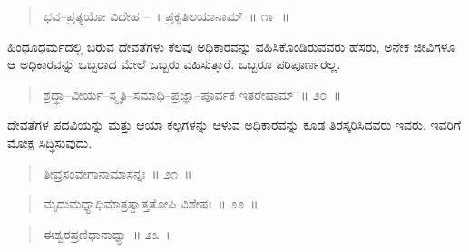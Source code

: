 \vspace{-0.3cm}

\begin{verse}
ಭವ–ಪ್ರತ್ಯಯೋ ವಿದೇಹ –~। ಪ್ರಕೃತಿಲಯಾನಾಮ್​~॥ ೧೯~॥
\end{verse}

\vspace{-0.3cm}


ಹಿಂಧೂಧರ್ಮದಲ್ಲಿ ಬರುವ ದೇವತೆಗಳು ಕೆಲವು ಅಧಿಕಾರವನ್ನು ವಹಿಸಿಕೊಂಡಿರುವ\break ವರು ಹೆಸರು, ಅನೇಕ ಜೀವಿಗಳೂ ಆ ಅಧಿಕಾರವನ್ನು ಒಬ್ಬರಾದ ಮೇಲೆ ಒಬ್ಬರು ವಹಿಸುತ್ತಾರೆ. ಒಬ್ಬರೂ ಪರಿಪೂರ್ಣರಲ್ಲ. 

\vspace{-0.3cm}

\begin{verse}
ಶ್ರದ್ಧಾ–ವೀರ್ಯ–ಸ್ಮೃತಿ–ಸಮಾಧಿ–ಪ್ರಜ್ಞಾ–ಪೂರ್ವಕ ಇತರೇಷಾಮ್​~॥ ೨೦~॥
\end{verse}

\vspace{-0.3cm}


ದೇವತೆಗಳ ಪದವಿಯನ್ನು ಮತ್ತು ಆಯಾ ಕಲ್ಪಗಳನ್ನು ಆಳುವ ಅಧಿಕಾರವನ್ನು ಕೂಡ ತಿರಸ್ಕರಿಸಿದವರು ಇವರು. ಇವರಿಗೆ ಮೋಕ್ಷ ಸಿದ್ಧಿಸುವುದು. 

\vspace{-0.3cm}

\begin{verse}
ತೀವ್ರಸಂವೇಗಾನಾಮಾಸನ್ನಃ~॥ ೨೧~॥
\end{verse}

\vspace{-0.3cm}


\vspace{-0.3cm}

\begin{verse}
ಮೃದುಮಧ್ಯಾಧಿಮಾತ್ರತ್ವಾತ್ತತೋಪಿ ವಿಶೇಷಃ~॥ ೨೨~॥
\end{verse}

\vspace{-0.3cm}


\vspace{-0.35cm}

\begin{verse}
ಈಶ್ವರಪ್ರಣಿಧಾನಾಧ್ಯಾ~॥ ೨೩~॥
\end{verse}

